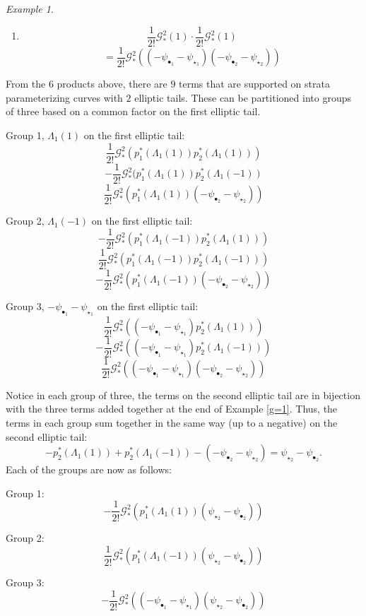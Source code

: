 \documentclass[leqno,12pt]{amsart}
\theoremstyle{remark}
\newtheorem{example}[theorem]{Example}
\numberwithin{equation}{section}
\begin{document}
\begin{example}
\begin{enumerate}
    \item 
    $$
    \frac{1}{2!}\mathcal{G}_*^2(1) \cdot \frac{1}{2!}\mathcal{G}_*^2(1)
    $$
    $$
    = \frac{1}{2!}\mathcal{G}_*^2((-\psi_{\bullet_1}-\psi_{\star_1})(-\psi_{\bullet_2}-\psi_{\star_2}))
    $$
\end{enumerate}

From the $6$ products above, there are $9$ terms that are supported on strata parameterizing curves with $2$ elliptic tails. These can be partitioned into groups of three based on a common factor on the first elliptic tail.

Group 1, $\Lambda_1(1)$ on the first elliptic tail: 
$$
\frac{1}{2!}\mathcal{G}_*^2(p_1^\ast(\Lambda_{1}(1))p_2^\ast(\Lambda_{1}(1)))
$$
$$
- \frac{1}{2!}\mathcal{G}_*^2(p_1^\ast(\Lambda_{1}(1))p_2^\ast(\Lambda_{1}(-1))
$$
$$
\frac{1}{2!}\mathcal{G}_*^2(p_1^\ast(\Lambda_{1}(1))(-\psi_{\bullet_2}-\psi_{\star_2}))
$$

Group 2, $\Lambda_1(-1)$ on the first elliptic tail:
$$
- \frac{1}{2!}\mathcal{G}_*^2(p_1^\ast(\Lambda_{1}(-1))p_2^\ast(\Lambda_{1}(1)))
$$
$$
\frac{1}{2!}\mathcal{G}_*^2(p_1^\ast(\Lambda_{1}(-1))p_2^\ast(\Lambda_{1}(-1)))
$$
$$
-\frac{1}{2!}\mathcal{G}_*^2(p_1^\ast(\Lambda_{1}(-1))(-\psi_{\bullet_2}-\psi_{\star_2}))
$$

Group 3, $-\psi_{\bullet_1}-\psi_{\star_1}$ on the first elliptic tail:
$$
\frac{1}{2!}\mathcal{G}_*^2((-\psi_{\bullet_1}-\psi_{\star_1})p_2^\ast(\Lambda_{1}(1))) 
$$
$$
-\frac{1}{2!}\mathcal{G}_*^2((-\psi_{\bullet_1}-\psi_{\star_1})p_2^\ast(\Lambda_{1}(-1)))
$$
$$
\frac{1}{2!}\mathcal{G}_*^2((-\psi_{\bullet_1}-\psi_{\star_1})(-\psi_{\bullet_2}-\psi_{\star_2}))
$$

Notice in each group of three, the terms on the second elliptic tail are in bijection with the three terms added together at the end of Example \ref{g=1}. Thus, the terms in each group sum together in the same way (up to a negative) on the second elliptic tail:
$$
-p_2^\ast(\Lambda_{1}(1)) + p_2^\ast(\Lambda_{1}(-1)) - (-\psi_{\bullet_2}-\psi_{\star_2}) = \psi_{\star_2}-\psi_{\bullet_2}.
$$
Each of the groups are now as follows:

Group 1: 
$$
-\frac{1}{2!}\mathcal{G}_*^2(p_1^\ast(\Lambda_{1}(1))(\psi_{\star_2}-\psi_{\bullet_2}))
$$

Group 2: 
$$
\frac{1}{2!}\mathcal{G}_*^2(p_1^\ast(\Lambda_{1}(-1))(\psi_{\star_2}-\psi_{\bullet_2}))
$$

Group 3: 
$$
-\frac{1}{2!}\mathcal{G}_*^2((-\psi_{\bullet_1}-\psi_{\star_1})(\psi_{\star_2}-\psi_{\bullet_2}))
$$


\end{example}
\end{document}
